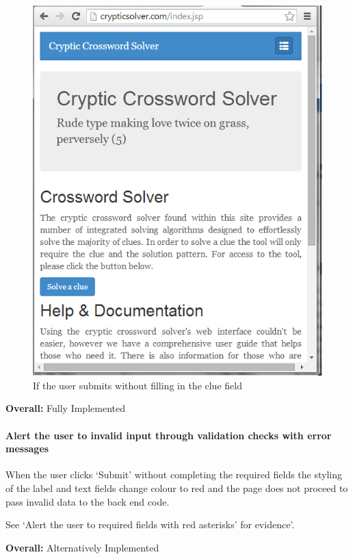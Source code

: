 \begin{figure}[H]
	\centering
	\includegraphics[keepaspectratio=true,scale=0.5]{evidence/scrolling1.png}
	\caption{If the user submits without filling in the clue field}
\end{figure}

{\bf Overall:} Fully Implemented

\paragraph{Alert the user to invalid input through validation checks
with error messages} 
     When the user clicks `Submit' without completing the required fields 
the styling of the label and text fields change colour to red and the page 
does not proceed to pass invalid data to the back end code. 

See `Alert the user to required fields with red asterisks' for evidence'.

{\bf Overall:} Alternatively Implemented 

